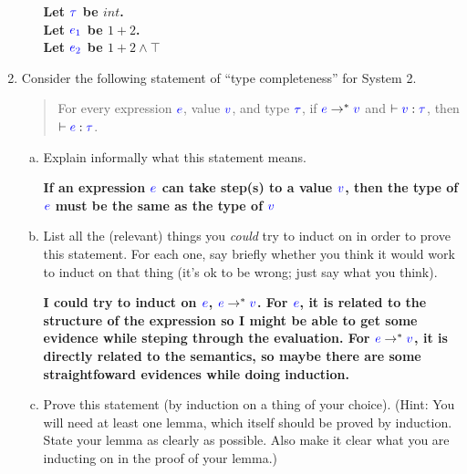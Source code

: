 \documentclass{article}
\newcommand{\meta}[1]{{\color{blue}#1}}
\begin{document}
\begin{enumerate}[leftmargin=*,itemindent=*,start=6,label={{\bf Problem \arabic*}.},ref=\arabic*]
\begin{enumerate}[(a)]
    \textbf{
      Let $\meta{\tau}$ be $int$. \\Let $\meta{e_1}$ be $1 + 2$. \\Let $\meta{e_2}$ be $1 + 2 \wedge \top$
    }

  \end{enumerate}
  \clearpage
\item\label{completeness} Consider the following statement of ``type completeness'' for System 2.
  \begin{quote}
    For every expression $\meta{e}$, value $\meta{v}$, and type $\meta{\tau}$,
    if $\meta{e} \to^* \meta{v}$ and $\vdash \meta{v} : \meta{\tau}$,
    then $\vdash \meta{e} : \meta{\tau}$.
  \end{quote}
  \begin{enumerate}[(a)]
  \item Explain informally what this statement means.
  
    \textbf{
      If an expression $\meta{e}$ can take step(s) to a value $\meta{v}$, then the type of $\meta{e}$ must be the same as the type of $\meta{v}$
    }

  \item List all the (relevant) things you \emph{could} try to induct on in order to prove this statement.
    For each one, say briefly whether you think it would work to induct on that thing
    (it's ok to be wrong; just say what you think).

    \textbf{
      I could try to induct on $\meta{e}$, $\meta{e}\to^* \meta{v}$. For $\meta{e}$, it is related to the structure of the expression so I might be able to get some evidence while steping through the evaluation. For $\meta{e}\to^* \meta{v}$, it is directly related to the semantics, so maybe there are some straightfoward evidences while doing induction.
    } 

  \item Prove this statement (by induction on a thing of your choice). (Hint: You will need at least one lemma, which
    itself should be proved by induction. State your lemma as clearly as possible. Also make it clear what you
    are inducting on in the proof of your lemma.)


\end{enumerate}
\end{enumerate}
\end{document}
